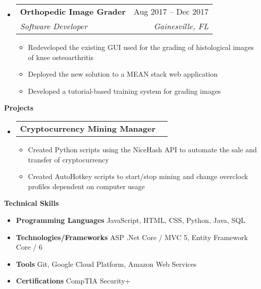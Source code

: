 \documentclass[letterpaper,12pt]{article}[leftmargin=*]
\makeatletter
\def \entryspacing {-0pt}
\renewcommand{\section}[2]{\vspace{5pt}
  \colorbox{secondary}{\color{white}\raggedbottom\normalsize\textbf{{#1}{\hspace{7pt}#2}}}
}
\newcommand{\resumeEntryStart}{\begin{itemize}[leftmargin=2.5mm]}
\newcommand{\resumeEntryEnd}{\end{itemize}\vspace{\entryspacing}}
\newcommand{\resumeItemListStart}{\begin{itemize}[leftmargin=4.5mm]}
\newcommand{\resumeItemListEnd}{\end{itemize}}
\newcommand{\resumeItem}[1]{
  \item\small{
    {#1 \vspace{-2pt}}
  }
}
\newcommand{\resumeEntryTSDL}[4]{
  \vspace{-1pt}\item[]
    \begin{tabularx}{0.97\textwidth}{X@{\hspace{60pt}}r}
      \textbf{\color{primary}#1} & {\firabook\color{accent}\small#2} \\
      \textit{\color{accent}\small#3} & \textit{\color{accent}\small#4} \\
    \end{tabularx}\vspace{-6pt}
}
\newcommand{\resumeEntryTD}[2]{
  \vspace{-1pt}\item[]
    \begin{tabularx}{0.97\textwidth}{X@{\hspace{60pt}}r}
      \textbf{\color{primary}#1} & {\firabook\color{accent}\small#2} \\
    \end{tabularx}\vspace{-6pt}
}
\newcommand{\resumeEntryS}[2]{
  \item[]\small{
    \textbf{\color{primary}#1 }{ #2 \vspace{-6pt}}
  }
}
\makeatother
\begin{document}
  \resumeEntryStart
    \resumeEntryTSDL
      {Orthopedic Image Grader}{Aug 2017 -- Dec 2017}
      {Software Developer}{Gainesville, FL}
    \resumeItemListStart
      \resumeItem {Redeveloped the existing GUI used for the grading of histological images of knee osteoarthritis}
      \resumeItem {Deployed the new solution to a MEAN stack web application}
      \resumeItem {Developed a tutorial-based training system for grading images}
    \resumeItemListEnd
  \resumeEntryEnd


\section{\faFlask}{Projects}

  \resumeEntryStart
    \resumeEntryTD
      {Cryptocurrency Mining Manager}{}
    \resumeItemListStart
      \resumeItem {Created Python scripts using the NiceHash API to automate the sale and transfer of cryptocurrency}
      \resumeItem {Created AutoHotkey scripts to start/stop mining and change overclock profiles dependent on computer usage}
    \resumeItemListEnd
  \resumeEntryEnd
  
\section{\faGears}{Technical Skills}
 \resumeEntryStart
  \resumeEntryS{Programming Languages } {JavaScript, HTML, CSS, Python, Java, SQL}
  \resumeEntryS{Technologies/Frameworks } {ASP .Net Core / MVC 5, Entity Framework Core / 6}
  \resumeEntryS{Tools } {Git, Google Cloud Platform, Amazon Web Services}
  \resumeEntryS{Certifications } {CompTIA Security+}
 \resumeEntryEnd
\end{document}

